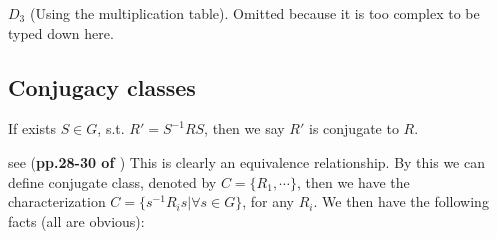 \begin{ex}
    $D_3$ (Using the multiplication table). Omitted because it is too
    complex to be typed down here.
\end{ex}

\subsection{Conjugacy classes}
\label{sec:Conjugacy-classes}

\begin{defi}[Conjugate]
    If exists $S\in G$, s.t. $R' = S^{-1}RS$, then we say $R'$ is
    conjugate to $R$.
\end{defi}
see (\textbf{pp.28-30 of \cite{book}})
This is clearly an equivalence relationship. By this we can define
conjugate class, denoted by $C=\{R_1,\cdots\}$, then we have the
characterization $C = \{ s^{-1} R_i s|\forall s\in G\}$, for any
$R_i$. We then have the following facts (all are obvious):
